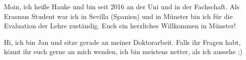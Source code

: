 \begin{multicols}{2}
{
Moin, ich heiße Hauke und bin seit 2016 an der Uni und in der Fachschaft. Als Erasmus Student war ich in Sevilla (Spanien) und in Münster bin ich für die Evaluation der Lehre zuständig. 
Euch ein herzliches Willkommen in Münster!
}


{
Hi, ich bin Jan und sitze gerade an meiner Doktorarbeit. Falls ihr Fragen habt, könnt ihr euch gerne an mich wenden, ich bin meistens netter, als ich aussehe ;)
}



\end{multicols}
